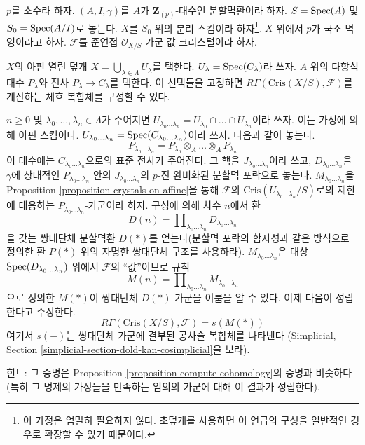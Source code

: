 \begin{remark}[체흐 복합체]
\label{remark-cech-complex}
$p$를 소수라 하자. $(A, I, \gamma)$를 $A$가
$\mathbf{Z}_{(p)}$-대수인 분할멱환이라 하자. $S = \mathop{\mathrm{Spec}}(A)$ 및
$S_0 = \mathop{\mathrm{Spec}}(A/I)$로 놓는다. $X$를 $S_0$ 위의
분리 스킴이라 하자\footnote{이 가정은 엄밀히 필요하지 않다.
초덮개를 사용하면 이 언급의 구성을 일반적인 경우로 확장할 수
있기 때문이다.}. $X$ 위에서 $p$가 국소 멱영이라고 하자.
$\mathcal{F}$를 준연접 $\mathcal{O}_{X/S}$-가군
값 크리스털이라 하자.

\medskip\noindent
$X$의 아핀 열린 덮개
$X = \bigcup_{\lambda \in \Lambda} U_\lambda$를 택한다.
$U_\lambda = \mathop{\mathrm{Spec}}(C_\lambda)$라 쓰자. $A$ 위의 다항식대수
$P_\lambda$와 전사 $P_\lambda \to C_\lambda$를 택한다. 이 선택들을
고정하면 $R\Gamma(\text{Cris}(X/S), \mathcal{F})$를 계산하는
체흐 복합체를 구성할 수 있다.

\medskip\noindent
$n \geq 0$ 및 $\lambda_0, \ldots, \lambda_n \in \Lambda$가 주어지면
$U_{\lambda_0 \ldots \lambda_n} = U_{\lambda_0} \cap \ldots
\cap U_{\lambda_n}$이라 쓰자. 이는 가정에 의해 아핀 스킴이다.
$U_{\lambda_0 \ldots \lambda_n} =
\mathop{\mathrm{Spec}}(C_{\lambda_0 \ldots \lambda_n})$이라 쓰자. 다음과 같이 놓는다.
$$
P_{\lambda_0 \ldots \lambda_n} =
P_{\lambda_0} \otimes_A \ldots \otimes_A P_{\lambda_n}
$$
이 대수에는 $C_{\lambda_0 \ldots \lambda_n}$으로의 표준 전사가
주어진다. 그 핵을 $J_{\lambda_0 \ldots \lambda_n}$이라 쓰고,
$D_{\lambda_0 \ldots \lambda_n}$을 $\gamma$에 상대적인
$P_{\lambda_0 \ldots \lambda_n}$ 안의
$J_{\lambda_0 \ldots \lambda_n}$의 $p$-진 완비화된 분할멱 포락으로
놓는다. $M_{\lambda_0 \ldots \lambda_n}$을 Proposition
\ref{proposition-crystals-on-affine}을 통해 $\mathcal{F}$의
$\text{Cris}(U_{\lambda_0 \ldots \lambda_n}/S)$로의 제한에 대응하는
$P_{\lambda_0 \ldots \lambda_n}$-가군이라 하자. 구성에 의해 차수
$n$에서 환
$$
D(n) =
\prod\nolimits_{\lambda_0 \ldots \lambda_n}
D_{\lambda_0 \ldots \lambda_n}
$$
을 갖는 쌍대단체 분할멱환 $D(*)$를 얻는다(분할멱 포락의 함자성과
같은 방식으로 정의한 환 $P(*)$ 위의 자명한 쌍대단체 구조를
사용하라). $M_{\lambda_0 \ldots \lambda_n}$은 대상
$\mathop{\mathrm{Spec}}(D_{\lambda_0 \ldots \lambda_n})$ 위에서 $\mathcal{F}$의
``값''이므로 규칙
$$
M(n) = \prod\nolimits_{\lambda_0 \ldots \lambda_n}
M_{\lambda_0 \ldots \lambda_n}
$$
으로 정의한 $M(*)$이 쌍대단체 $D(*)$-가군을 이룸을 알 수 있다.
이제 다음이 성립한다고 주장한다.
$$
R\Gamma(\text{Cris}(X/S), \mathcal{F}) = s(M(*))
$$
여기서 $s(-)$는 쌍대단체 가군에 결부된 공사슬 복합체를 나타낸다
(Simplicial, Section
\ref{simplicial-section-dold-kan-cosimplicial}을 보라).

\medskip\noindent
힌트: 그 증명은 Proposition \ref{proposition-compute-cohomology}의
증명과 비슷하다(특히 그 명제의 가정들을 만족하는 임의의 가군에
대해 이 결과가 성립한다).
\end{remark}


